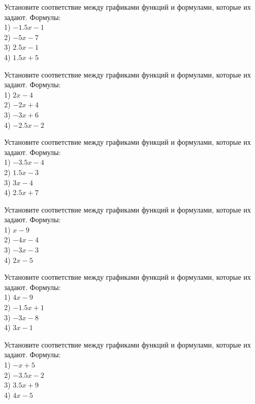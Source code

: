 \documentclass[4apaper]{article}
\begin{document}
\begin{taskBN}{37}
Установите соответствие между графиками функций и формулами, которые их задают. Формулы: \\1) $-1.5x-1$\\2) $-5x-7$\\3) $2.5x-1$\\4) $1.5x+5$
\end{taskBN}

\begin{taskBN}{38}
Установите соответствие между графиками функций и формулами, которые их задают. Формулы: \\1) $2x-4$\\2) $-2x+4$\\3) $-3x+6$\\4) $-2.5x-2$
\end{taskBN}

\begin{taskBN}{39}
Установите соответствие между графиками функций и формулами, которые их задают. Формулы: \\1) $-3.5x-4$\\2) $1.5x-3$\\3) $3x-4$\\4) $2.5x+7$
\end{taskBN}

\begin{taskBN}{40}
Установите соответствие между графиками функций и формулами, которые их задают. Формулы: \\1) $x-9$\\2) $-4x-4$\\3) $-3x-3$\\4) $2x-5$
\end{taskBN}

\begin{taskBN}{41}
Установите соответствие между графиками функций и формулами, которые их задают. Формулы: \\1) $4x-9$\\2) $-1.5x+1$\\3) $-3x-8$\\4) $3x-1$
\end{taskBN}

\begin{taskBN}{42}
Установите соответствие между графиками функций и формулами, которые их задают. Формулы: \\1) $-x+5$\\2) $-3.5x-2$\\3) $3.5x+9$\\4) $4x-5$
\end{taskBN}
\end{document}
